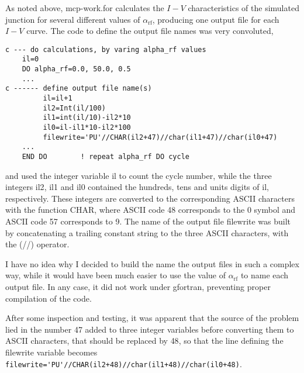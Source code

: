 As noted above, \textsf{mcp-work.for} calculates the $I - V$ characteristics of the simulated junction for several different values of $\alpha_\mathrm{rf}$, producing one output file for each $I - V$ curve. The code to define the output file names was very convoluted,

\begin{lstlisting}
c --- do calculations, by varing alpha_rf values
	il=0
	DO alpha_rf=0.0, 50.0, 0.5
	...
c ------ define output file name(s)
         il=il+1
         il2=Int(il/100)
         il1=int(il/10)-il2*10
         il0=il-il1*10-il2*100
         filewrite='PU'//CHAR(il2+47)//char(il1+47)//char(il0+47)
	...
	END DO        ! repeat alpha_rf DO cycle

\end{lstlisting}

and used the integer variable \textsf{il} to count the cycle number, while the three integers \textsf{il2}, \textsf{il1} and \textsf{il0} contained the hundreds, tens and units digits of \textsf{il}, respectively. 
These integers are converted to the corresponding \textsf{ASCII} characters with the function \textsf{CHAR}, where \textsf{ASCII} code 48 corresponds to the \textsf{0} symbol and \textsf{ASCII} code 57 corresponds to \textsf{9}.
The name of the output file \textsf{filewrite} was built by concatenating a trailing constant string to the three \textsf{ASCII} characters, with the \textsf(//) operator.

I have no idea why I decided to build the name the output files in such a complex way, while it would have been much easier to use the value of $\alpha_\mathrm{rf}$ to name each output file.
In any case, it did not work under gfortran, preventing proper compilation of the code. 

After some inspection and testing, it was apparent that the source of the problem lied in the number \textsf{47} added to three integer variables before converting them to \textsf{ASCII} characters, that should be replaced by \textsf{48}, so that the line defining the \textsf{filewrite} variable becomes \lstinline[columns=fixed]{filewrite='PU'//CHAR(il2+48)//char(il1+48)//char(il0+48)}.


